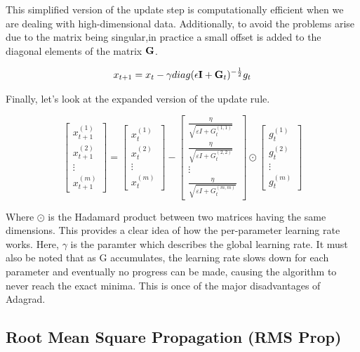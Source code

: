 This simplified version of the update step is computationally efficient when we are dealing with high-dimensional data. Additionally, to avoid the problems arise due to the matrix being singular,in practice a small offset is added to the diagonal elements of the matrix $\mathbf{G}$.  

\begin{align}
    x_{t+1} = x_{t} - \gamma diag(\epsilon\mathbf{I} + \mathbf{G}_t)^{-\frac{1}{2}} g_t
\end{align}


Finally, let's look  at the expanded version of the update rule. 

\[
\begin{bmatrix}
x^{(1)}_{t+1} \\
x^{(2)}_{t+1} \\
\vdots \\
x^{(m)}_{t+1}
\end{bmatrix}
=
\begin{bmatrix}
x^{(1)}_{t} \\
x^{(2)}_{t} \\
\vdots \\
x^{(m)}_{t}
\end{bmatrix}
-
\begin{bmatrix}
\frac{\eta}{\sqrt{\varepsilon I+ G^{(1,1)}_t}}\\
 \frac{\eta}{\sqrt{\varepsilon I + G^{(2,2)}_t}}  \\
 \vdots\\
 \frac{\eta}{\sqrt{\varepsilon I + G^{(m,m)}_t}}
\end{bmatrix}
\odot 
\begin{bmatrix}
g^{(1)}_t \\
g^{(2)}_t \\
\vdots \\
g^{(m)}_t
\end{bmatrix}
\]

Where $\odot$ is the Hadamard product between two matrices having the same dimensions. This provides a clear idea of how the per-parameter learning rate works. Here, $\gamma$ is the paramter which describes the global learning rate. It must also be noted that as G accumulates, the learning rate slows down for each parameter and eventually no progress can be made, causing the algorithm to never reach the exact minima. This is once of the major disadvantages of Adagrad.

\subsection{Root Mean Square Propagation (\textbf{RMS Prop)}}

